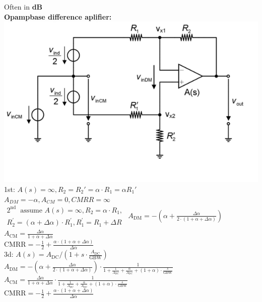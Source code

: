 \documentclass[5pt,landscape]{article}
\begin{document}
\begin{multicols*}{5}
Often in \textbf{dB}\\
\textbf{Opampbase difference aplifier:}\\
\includegraphics[width=\columnwidth]{images/diffbased_opamp.png}\\
1st: $ A(s) = \infty, R_2 = R_2' = \alpha \cdot R_1 = \alpha R_1'$\\
$ A_{DM} = - \alpha, A_{CM} =0, CMRR = \infty $ \\
$ \begin{array}{l}
2^{\text {nd }} \text { assume } A(s)=\infty, R_{2}=\alpha \cdot R_{1}, \\
R_{2}^{\prime}=(\alpha+\Delta \alpha) \cdot R_{1}^{\prime}, R_{1}^{\prime}=R_{1}+\Delta R
\end{array} $
$ 
A_{\mathrm{DM}} =-\left( \alpha+\frac{\Delta \alpha}{2 \cdot(1+\alpha+\Delta \alpha)} \right)$ \\
$A_{\mathrm{CM}} =\frac{\Delta \alpha}{1+\alpha+\Delta \alpha} $\\
$\mathrm{CMRR} =-\frac{1}{2}+\frac{\alpha \cdot(1+\alpha+\Delta \alpha)}{\Delta \alpha}
$\\
3d: $ A(s)=A_{\mathrm{DC}} /\left(1+s \cdot \frac{A_{\mathrm{DC}}}{\mathrm{GBW}}\right) $\\
$ A_{\mathrm{DM}} =-\left(\alpha+\frac{\Delta \alpha}{2 \cdot(1+\alpha+\Delta \alpha)}\right) \cdot \frac{1}{1+\frac{1}{A_{\mathrm{DC}}}+\frac{\alpha}{A_{\mathrm{DC}}}+(1+\alpha) \cdot \frac{s}{\mathrm{GBW}}} $\\
$A_{\mathrm{CM}} =\frac{\Delta \alpha}{1+\alpha+\Delta \alpha} \cdot \frac{1}{1+\frac{1}{A_{\mathrm{DC}}}+\frac{\alpha}{A_{\mathrm{DC}}}+(1+\alpha) \cdot \frac{s}{\mathrm{GBW}}}$ \\
$\mathrm{CMRR} =-\frac{1}{2}+\frac{\alpha \cdot(1+\alpha+\Delta \alpha)}{\Delta \alpha}$

\end{multicols*}
\end{document}
